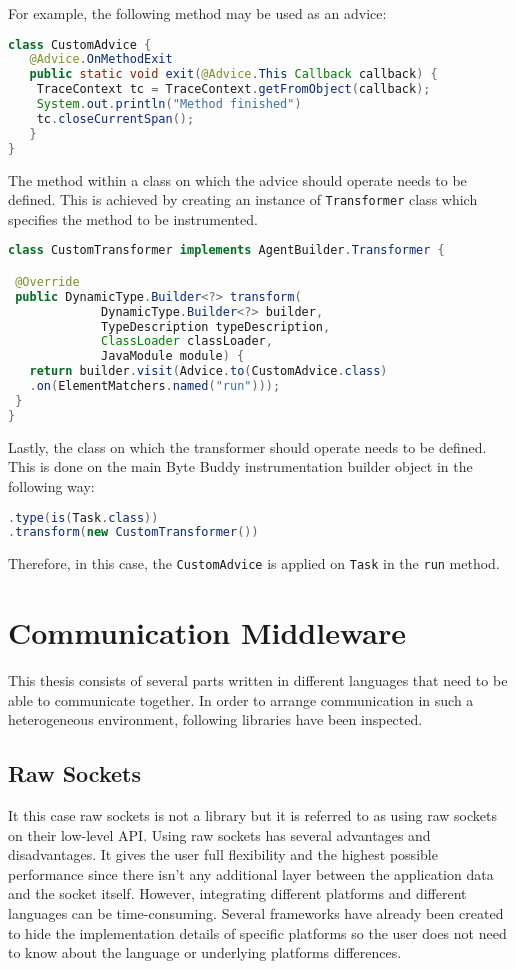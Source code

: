 For example, the following method may be used as an advice: 
\begin{lstlisting}[language=Java]
class CustomAdvice {
   @Advice.OnMethodExit
   public static void exit(@Advice.This Callback callback) {
   	TraceContext tc = TraceContext.getFromObject(callback);
   	System.out.println("Method finished")
   	tc.closeCurrentSpan();
   }
}   
\end{lstlisting}

The method within a class on which the advice should operate needs to be defined. This is achieved by creating an instance of \texttt{Transformer} class which specifies the method to be instrumented.

\begin{lstlisting}[language=Java]
class CustomTransformer implements AgentBuilder.Transformer {

 @Override
 public DynamicType.Builder<?> transform(
			 DynamicType.Builder<?> builder,
			 TypeDescription typeDescription,
			 ClassLoader classLoader,
			 JavaModule module) {
   return builder.visit(Advice.to(CustomAdvice.class)
   .on(ElementMatchers.named("run")));
 }
}
\end{lstlisting}

Lastly, the class on which the transformer should operate needs to be defined. This is done on the main Byte Buddy instrumentation builder object in the following way:

\begin{lstlisting}[language=Java]
.type(is(Task.class))
.transform(new CustomTransformer())
\end{lstlisting}

Therefore, in this case, the \texttt{CustomAdvice} is applied on \texttt{Task} in the \texttt{run} method.
\section{Communication Middleware}
This thesis consists of several parts written in different languages that need to be able to communicate together. In order to arrange communication in such a heterogeneous environment, following libraries have been inspected.
\subsection{Raw Sockets}
\label{raw_sockets}
It this case raw sockets is not a library but it is referred to as using raw sockets on their low-level API. Using raw sockets has several advantages and disadvantages. It gives the user full flexibility and the highest possible performance since there isn't any additional layer between the application data and the socket itself. However, integrating different platforms and different languages can be time-consuming. Several frameworks have already been created to hide the implementation details of specific platforms so the user does not need to know about the language or underlying platforms differences.
